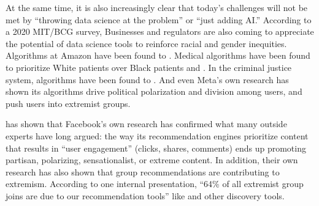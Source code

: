 \documentclass[letterpaper,10pt,english]{jupyterBook}
\begin{document}
\sphinxAtStartPar
At the same time, it is also increasingly clear that today’s challenges will not be met by “throwing data science at the problem” or “just adding AI.” According to a 2020 MIT/BCG survey,  Businesses and regulators are also coming to appreciate the potential of data science tools to reinforce racial and gender inequities. Algorithms at Amazon have been found to . Medical algorithms have been found to prioritize White patients over Black patients  and . In the criminal justice system, algorithms have been found to . And even Meta’s own research has shown its algorithms drive political polarization and division among users, and push users into extremist groups.%
\begin{footnote}[1]\sphinxAtStartFootnote
{} has shown that Facebook’s own research has confirmed what many outside experts have long argued: the way its recommendation engines prioritize content that results in “user engagement” (clicks, shares, comments) ends up promoting partisan, polarizing, sensationalist, or extreme content. In addition, their own research has also shown that group recommendations are contributing to extremism. According to one internal presentation, “64\% of all extremist group joins are due to our recommendation tools” like  and other discovery tools.
%
\end{footnote}
\end{document}
